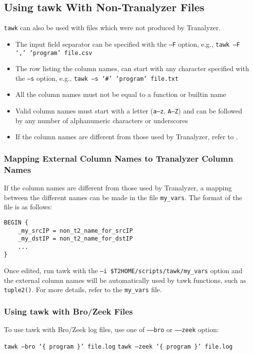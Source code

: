 \documentclass[documentation]{subfiles}
\begin{document}
\subsection{Using tawk With Non-Tranalyzer Files}\label{tawk-non-tranalyzer}
{\tt tawk} can also be used with files which were not produced by Tranalyzer.

\begin{itemize}
    \item The input field separator can be specified with the {\tt --F} option, e.g., {\tt tawk --F `,' `program' file.csv}
    \item The row listing the column names, can start with any character specified with the {\tt --s} option, e.g., {\tt tawk --s `\#' `program' file.txt}
    \item All the column names must not be equal to a function or builtin name
    \item Valid column names must start with a letter ({\tt a--z}, {\tt A--Z}) and can be followed by any number of alphanumeric characters or underscores
    \item If the column names are different from those used by Tranalyzer, refer to .
\end{itemize}

\subsubsection{Mapping External Column Names to Tranalyzer Column Names}\label{tawk:my_vars}
If the column names are different from those used by Tranalyzer, a mapping between the different names can be made in the file {\tt my\_vars}.
The format of the file is as follows:
\begin{verbatim}
BEGIN {
    _my_srcIP = non_t2_name_for_srcIP
    _my_dstIP = non_t2_name_for_dstIP
    ...
}
\end{verbatim}
Once edited, run tawk with the {\tt --i \$T2HOME/scripts/tawk/my\_vars} option and the external column names will be automatically used by tawk functions, such as {\tt tuple2()}.
For more details, refer to the {\tt my\_vars} file.

\subsubsection{Using tawk with Bro/Zeek Files}
To use tawk with Bro/Zeek log files, use one of {\tt --{}--bro} or {\tt --{}--zeek} option:
\begin{center}
    {\tt tawk --bro `\{ program \}' file.log}
    {\tt tawk --zeek `\{ program \}' file.log}
\end{center}
\end{document}
